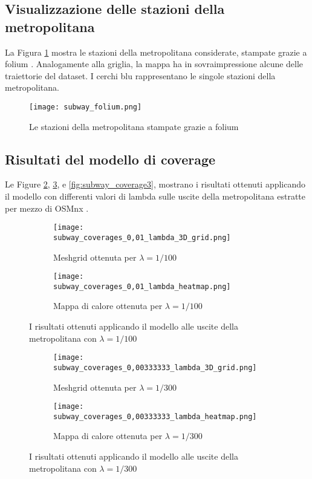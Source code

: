 \subsection{Visualizzazione delle stazioni della metropolitana}
La Figura \ref{fig:subway} mostra le stazioni della metropolitana considerate, stampate grazie a folium \cite{folium}.
Analogamente alla griglia, la mappa ha in sovraimpressione alcune delle traiettorie del dataset. I cerchi blu rappresentano le singole stazioni della metropolitana.

\begin{figure}[H]
	\centering 
	\texttt{[image: subway\_folium.png]}
	\caption[Mappa delle stazioni della metropolitana]{Le stazioni della metropolitana stampate grazie a folium}
	\label{fig:subway}
\end{figure}

\subsection{Risultati del modello di coverage}
Le Figure \ref{fig:subway_coverage1}, \ref{fig:subway_coverage2}, e \ref{fig:subway_coverage3}, mostrano i risultati ottenuti applicando il modello con differenti valori di lambda sulle uscite della metropolitana estratte per mezzo di OSMnx \cite{osmnx}. 

\begin{figure}[H]
	\centering
	\begin{subfigure}[b]{\linewidth}
		\texttt{[image: subway\_coverages\_0,01\_lambda\_3D\_grid.png]}
		\caption{Meshgrid ottenuta per $\lambda = 1/100$}
	\end{subfigure}
	\begin{subfigure}[b]{\linewidth}
		\texttt{[image: subway\_coverages\_0,01\_lambda\_heatmap.png]}
		\caption{Mappa di calore ottenuta per $\lambda = 1/100$}
	\end{subfigure}
	\caption[Risultati metropolitana, $\lambda = 1/100$]{I risultati ottenuti applicando il modello alle uscite della metropolitana con $\lambda = 1/100$}
	\label{fig:subway_coverage1}
\end{figure}

\begin{figure}[H]
	\centering
	\begin{subfigure}[b]{\linewidth}
		\texttt{[image: subway\_coverages\_0,00333333\_lambda\_3D\_grid.png]}
		\caption{Meshgrid ottenuta per $\lambda = 1/300$}
	\end{subfigure}
	\begin{subfigure}[b]{\linewidth}
		\texttt{[image: subway\_coverages\_0,00333333\_lambda\_heatmap.png]}
		\caption{Mappa di calore ottenuta per $\lambda = 1/300$}
	\end{subfigure}
	\caption[Risultati metropolitana, $\lambda = 1/300$]{I risultati ottenuti applicando il modello alle uscite della metropolitana con $\lambda = 1/300$}
	\label{fig:subway_coverage2}
\end{figure}


